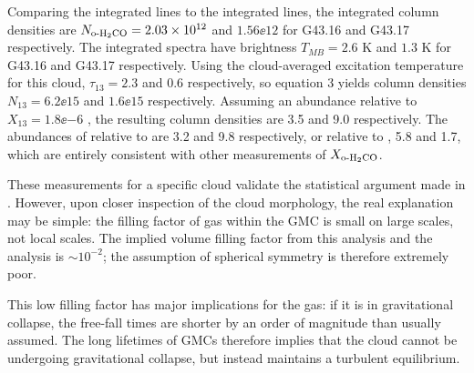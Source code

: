 
Comparing the integrated \formaldehyde lines to the integrated \thirteenco
lines, the integrated \formaldehyde column densities are
$N_{\textrm{o-H}_2\textrm{CO}} = 2.03\times10^{12} $ and $1.56\ee{12}$ \persc for G43.16
and G43.17 respectively.
The \thirteenco integrated spectra have brightness $T_{MB} = 2.6$ K and $1.3$ K
for G43.16 and G43.17 respectively.  Using the cloud-averaged excitation
temperature for this cloud, $\tau_{13}=2.3$ and $0.6$ respectively, so
\citet{Roman-Duval2010a} equation 3 yields column densities $N_{13} = 6.2\ee{15}
$ and $1.6\ee{15}$ \percc respectively.  Assuming an abundance relative to \hh
$X_{13} = 1.8\ee{-6}$ \citep[consistent with ][]{Roman-Duval2010a}, the
resulting \hh column densities are 3.5 and 9.0  \percc
respectively.  The abundances of \ortho relative to \thirteenco are 3.2
and 9.8 respectively, or relative to \hh, 5.8 and 1.7,
which are entirely consistent with other measurements of $X_{\textrm{o-H}_2\textrm{CO}}$.  

These measurements for a specific cloud validate the statistical argument made
in \citet{Ginsburg2011a}.  However, upon closer inspection of the cloud
morphology, the real explanation may be simple: the filling factor of gas
within the GMC is small on large scales, not local scales.  The implied volume
filling factor from this analysis and the \citet{Ginsburg2011a} analysis is
$\sim10^{-2}$; the assumption of spherical symmetry is therefore extremely
poor.  

This low filling factor has major implications for the gas: if it is in
gravitational collapse, the free-fall times are shorter by an order of
magnitude than usually assumed.  The long lifetimes of GMCs therefore implies
that the cloud cannot be undergoing gravitational collapse, but instead
maintains a turbulent equilibrium.  

